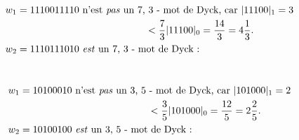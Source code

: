\begin{example}[Définition 11 : $a > b : a = 7, b = 3$]
    ~\\
    \begin{align*}
        &w_1 = 1110011110 \text{ n'est \emph{pas} un 7, 3 - mot de
        Dyck, car } |11100|_1 = 3\\
        & \hspace{5cm} < \frac{7}{3}|11100|_0
        = \frac{14}{3} = 4 \frac{1}{3}.\\
        &w_2 = 1110111010 \text{ \emph{est} un 7, 3 - mot de Dyck : }\\
    \end{align*}
    
\end{example}

\begin{example}[Définition 11 : $a < b : a = 3, b = 5$]
    ~\\
    \begin{align*}
        &w_1 = 10100010 \text{ n'est \emph{pas} un 3, 5 - mot de
        Dyck, car } |101000|_1 = 2\\
        & \hspace{5cm} < \frac{3}{5}|101000|_0
        = \frac{12}{5} = 2 \frac{2}{5}.\\
        &w_2 = 10100100 \text{ \emph{est} un 3, 5 - mot de Dyck : }\\
    \end{align*}
    
\end{example}